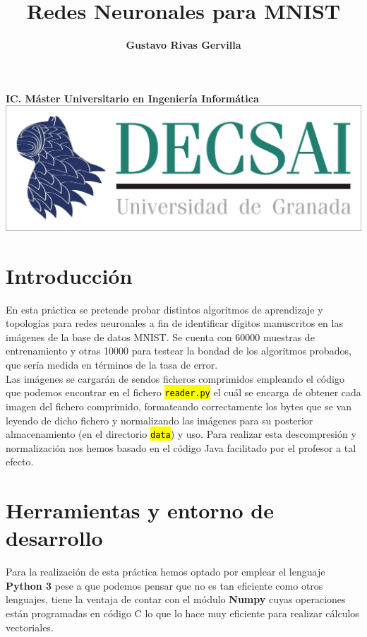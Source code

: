 \documentclass[10pt,a4paper]{article}
\author{\textbf{Gustavo Rivas Gervilla}}
\title{\textcolor{deepblue}{\textbf{Redes Neuronales para MNIST}}}
\date{}
\newcommand{\archive}[1]{\sethlcolor{light-green}\hl{\texttt{#1}}} %
\begin{document}
\maketitle
\begin{center}
\textbf{IC. Máster Universitario en Ingeniería Informática}
\newline
\newline
\newline
\includegraphics[scale=0.5]{img/decsai}
\end{center}

\newpage
\tableofcontents
\newpage

\def\layersep{2.5cm}

\section{Introducción}

En esta práctica se pretende probar distintos algoritmos de aprendizaje y topologías para redes neuronales a fin de identificar dígitos manuscritos en las imágenes de la base de datos MNIST. Se cuenta con 60000 muestras de entrenamiento y otras 10000 para testear la bondad de los algoritmos probados, que sería medida en términos de la tasa de error.\\

Las imágenes se cargarán de sendos ficheros comprimidos empleando el código que podemos encontrar en el fichero \archive{reader.py} el cuál se encarga de obtener cada imagen del fichero comprimido, formateando correctamente los bytes que se van leyendo de dicho fichero y normalizando las imágenes para su posterior almacenamiento (en el directorio \archive{data}) y uso. Para realizar esta descompresión y normalización nos hemos basado en el código Java facilitado por el profesor a tal efecto.

\section{Herramientas y entorno de desarrollo}
Para la realización de esta práctica hemos optado por emplear el lenguaje \textbf{Python 3} pese a que podemos pensar que no es tan eficiente como otros lenguajes, tiene la ventaja de contar con el módulo \textbf{Numpy} cuyas operaciones están programadas en código C lo que lo hace muy eficiente para realizar cálculos vectoriales.\\
\end{document}
